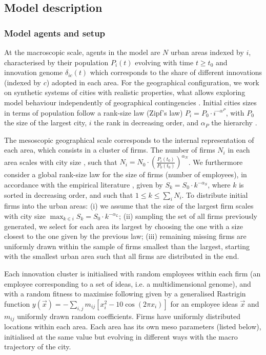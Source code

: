 \documentclass[letterpaper]{article}
\begin{document}
\subsection{Model description}

\subsubsection{Model agents and setup}

At the macroscopic scale, agents in the model are $N$ urban areas indexed by $i$, characterised by their population $P_i(t)$ evolving with time $t\geq t_0$ and innovation genome $\delta_{ic}(t)$ which corresponds to the share of different innovations (indexed by $c$) adopted in each area. For the geographical configuration, we work on synthetic systems of cities with realistic properties, what allows exploring model behaviour independently of geographical contingencies \citep{raimbault2019space}. Initial cities sizes in terms of population follow a rank-size law (Zipf's law) $P_i = P_0 \cdot i^{-\alpha^P}$, with $P_0$ the size of the largest city, $i$ the rank in decreasing order, and $\alpha_P$ the hierarchy \citep{ioannides2003zipf}.

The mesoscopic geographical scale corresponds to the internal representation of each area, which consists in a cluster of firms. The number of firms $N_i$ in each area scales with city size \citep{pumain2006evolutionary}, such that $N_i = N_0 \cdot \left(\frac{P_i (t_0)}{P_0 (t_0)}\right)^{\alpha_N}$. We furthermore consider a global rank-size law for the size of firms (number of employees), in accordance with the empirical literature \citep{axtell2001zipf}, given by $S_k = S_0 \cdot k^{- \alpha_S}$, where $k$ is sorted in decreasing order, and such that $1 \leq k \leq \sum_i N_i$. To distribute initial firms into the urban areas: (i) we assume that the size of the largest firm scales with city size $\max_{k\in i} S_k = S_0 \cdot k^{- \alpha_L}$; (ii) sampling the set of all firms previously generated, we select for each area its largest by choosing the one with a size closest to the one given by the previous law; (iii) remaining missing firms are uniformly drawn within the sample of firms smallest than the largest, starting with the smallest urban area such that all firms are distributed in the end.

Each innovation cluster is initialised with random employees within each firm (an employee corresponding to a set of ideas, i.e. a multidimensional genome), and with a random fitness to maximise following \cite{raimbault2022innovation} given by a generalised Rastrigin function $y(\vec{x}) = - \sum_{i,j} m_{ij} \left[x_i^2 - 10 \cos\left(2 \pi x_i\right) \right] $ for an employee ideas $\vec{x}$ and $m_{ij}$ uniformly drawn random coefficients. Firms have uniformly distributed locations within each area. Each area has its own meso parameters (listed below), initialised at the same value but evolving in different ways with the macro trajectory of the city.
\end{document}
